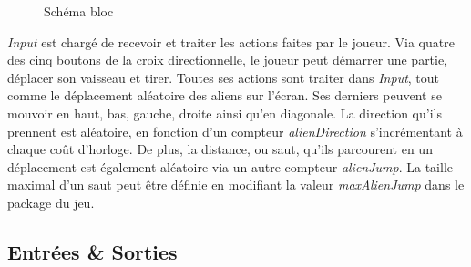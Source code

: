 \documentclass[french]{nakrule}
\begin{document}
\begin{figure}
\caption{Schéma bloc}
\label{inputBloc}
\end{figure}

\emph{Input} est chargé de recevoir et traiter les actions faites par le joueur.
Via quatre des cinq boutons de la croix directionnelle, le joueur peut démarrer
une partie, déplacer son vaisseau et tirer. Toutes ses actions sont traiter dans
\emph{Input}, tout comme le déplacement aléatoire des aliens sur l'écran. Ses
derniers peuvent se mouvoir en haut, bas, gauche, droite ainsi qu'en diagonale.
La direction qu'ils prennent est aléatoire, en fonction d'un compteur
\emph{alienDirection} s'incrémentant à chaque coût d'horloge. De plus, la
distance, ou saut, qu'ils parcourent en un déplacement est également aléatoire
via un autre compteur \emph{alienJump}. La taille maximal d'un saut peut être
définie en modifiant la valeur \emph{maxAlienJump} dans le package du jeu.



\subsection{Entrées \& Sorties}
\label{subsec:Entrees_Sorties_input}
\end{document}
